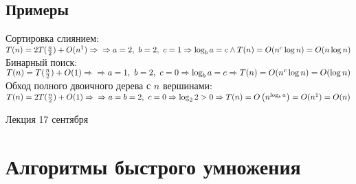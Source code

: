 \documentclass[12pt, a4paper]{article}
\begin{document}
    \subsection*{Примеры}
    Сортировка слиянием:\\
    $T(n) = 2T(\frac{n}{2}) + O(n^1)\Rightarrow\\
    \Rightarrow a = 2,\ b = 2,\ c = 1\Rightarrow \log_b a = c \wedge T(n) = O(n^c\log n) = O(n\log n)$\\
    Бинарный поиск:\\
    $T(n) = T(\frac{n}{2}) + O(1)\Rightarrow\\
    \Rightarrow a = 1,\ b = 2,\ c = 0\Rightarrow \log_b a = c\Rightarrow T(n) = O(n^c\log n) = O(\log n)$\\
    Обход полного двоичного дерева с $n$ вершинами:\\
    $T(n) = 2T(\frac{n}{2}) + O(1)\Rightarrow\\
    \Rightarrow a = b = 2,\ c = 0\Rightarrow \log_2 2 > 0\Rightarrow T(n) = O\left(n^{\log_b a}\right) = O(n^1) = O(n)$
    \begin{center}
        Лекция 17 сентября
    \end{center}
    \section{Алгоритмы быстрого умножения}
\end{document}
